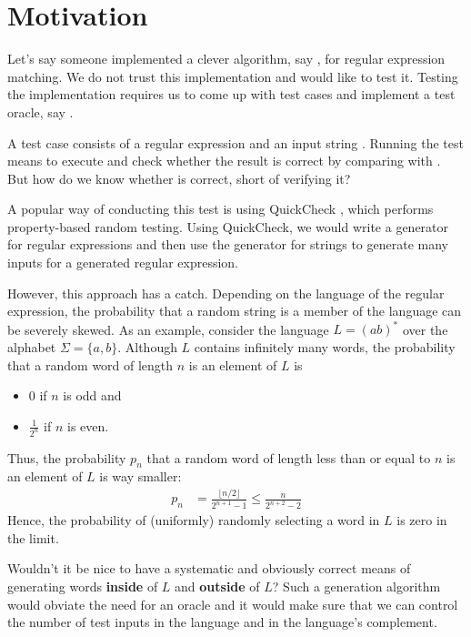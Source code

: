 \section{Motivation}
\label{sec:motivation}

Let's say someone implemented a clever algorithm, say , for
regular expression matching. 
We do not trust this implementation and would like to test it.
Testing the implementation requires us to come up with test cases and
implement a test oracle, say .

A test case consists of a regular expression  and an input
string . Running the test means to execute  and check whether the result is correct by comparing with
. But how do we know whether
 is correct, short of verifying it?

A popular way of conducting this test is using QuickCheck
\cite{quickcheck}, which performs property-based random testing. Using
QuickCheck, we would write a generator for regular expressions and then
use the generator for strings to generate many inputs for a
generated regular expression.

However, this approach has a
catch. Depending on the language of the regular expression, the
probability that a random string is a member of the language can be
severely skewed. As an example, consider the language $L = (ab)^*$ over the
alphabet $\Sigma = \{a, b\}$. Although $L$ contains infinitely many
words, the probability that a random word of
length $n$ is an element of $L$ is
\begin{itemize}
\item $0$ if $n$ is odd and
\item $\frac{1}{2^n}$ if $n$ is even.
\end{itemize}
Thus, the probability $p_n$ that a random word of length less than or equal to
$n$ is an element of $L$ is way smaller:
\begin{align*}
  p_n &= \frac{\lfloor n/2 \rfloor}{2^{n+1} - 1}
        \le \frac{n}{2^{n+2} - 2}
\end{align*}
Hence, the probability of (uniformly) randomly
selecting a word in $L$ is zero in the limit.

Wouldn't it be nice to have a systematic and obviously correct means
of generating words \textbf{inside} of $L$ and \textbf{outside} of
$L$? Such a generation algorithm would obviate the need for an oracle
and it would make sure that we can control the number of test inputs
in the language and in the language's complement.

